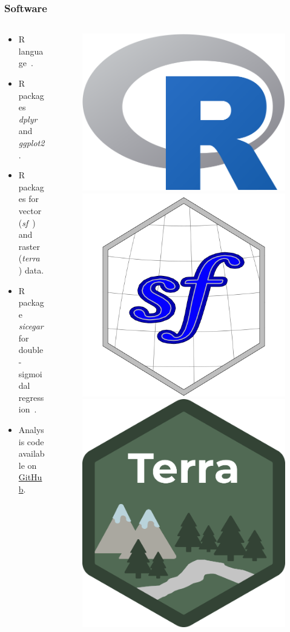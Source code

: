 \documentclass[aspectratio=169]{beamer}
\begin{document}
\begin{frame}
    \frametitle{Software}
    \begin{columns}
        \begin{column}{0.5\linewidth}
            \begin{itemize}
                \item R language~\cite{ihaka1996}.
                \item R packages \textit{dplyr} and \textit{ggplot2}.
                \item R packages for vector (\textit{sf}~\cite{pebesma2018})
                    and raster (\textit{terra}~\cite{hijmans2020}) data.
                \item R package \textit{sicegar} for double-sigmoidal
                    regression~\cite{caglar2018}.
                \item Analysis code available on
                    \href{https://github.com/albhasan/seasonmetrics}{GitHub}.
            \end{itemize}
        \end{column}
        \begin{column}{0.5\linewidth}
            \begin{figure}[h]
                \includegraphics[width=0.35\linewidth]{./logos/Rlogo.png}
                \includegraphics[width=0.29\linewidth]{./logos/sf_logo.png}
                \includegraphics[width=0.25\linewidth]{./logos/terra_logo.png}\\

\end{figure}
\end{column}
\end{columns}
\end{frame}
\end{document}
